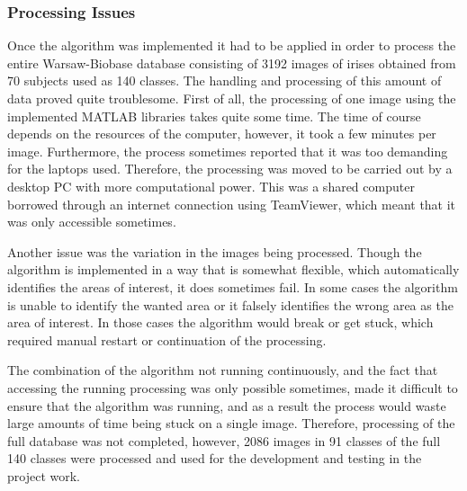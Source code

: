 \subsubsection{Processing Issues}
Once the algorithm was implemented it had to be applied in order to process the entire Warsaw-Biobase database consisting of 3192 images of irises obtained from 70 subjects used as 140 classes. The handling and processing of this amount of data proved quite troublesome. First of all, the processing of one image using the implemented MATLAB libraries takes quite some time. The time of course depends on the resources of the computer, however, it took a few minutes per image. Furthermore, the process sometimes reported that it was too demanding for the laptops used. Therefore, the processing was moved to be carried out by a desktop PC with more computational power. This was a shared computer borrowed through an internet connection using TeamViewer, which meant that it was only accessible sometimes. 

Another issue was the variation in the images being processed. Though the algorithm is implemented in a way that is somewhat flexible, which automatically identifies the areas of interest, it does sometimes fail. In some cases the algorithm is unable to identify the wanted area or it falsely identifies the wrong area as the area of interest. In those cases the algorithm would break or get stuck, which required manual restart or continuation of the processing. 

The combination of the algorithm not running continuously, and the fact that accessing the running processing was only possible sometimes, made it difficult to ensure that the algorithm was running, and as a result the process would waste large amounts of time being stuck on a single image. Therefore, processing of the full database was not completed, however, 2086 images in 91 classes of the full 140 classes were processed and used for the development and testing in the project work. 











